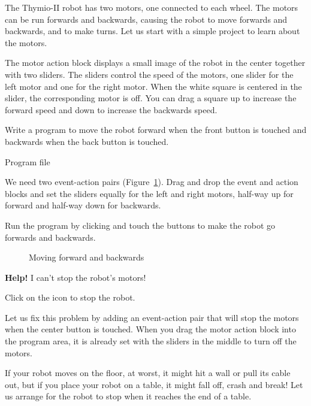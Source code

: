 

The Thymio-II robot has two motors, one connected to each wheel. The
motors can be run forwards and backwards, causing the robot to move
forwards and backwards, and to make turns. Let us start with a simple
project to learn about the motors.

The motor action block  displays a small image of the
robot in the center together with two sliders. The sliders control the
speed of the motors, one slider for the left motor and one for the right
motor. When the white square is centered in the slider, the
corresponding motor is off. You can drag a square up to increase the
forward speed and down to increase the backwards speed.

Write a program to move the robot forward when the front button
is touched and backwards when the back button is touched.

{\raggedleft \hfill Program file }

We need two event-action pairs (Figure~\ref{fig.nostop}). Drag and drop
the event and action blocks and set the sliders equally for the left and
right motors, half-way up for forward and half-way down for backwards.

Run the program by clicking  and touch the buttons to
make the robot go forwards and backwards.

\begin{figure}
\begin{center}
\caption{Moving forward and backwards}\label{fig.nostop}
\end{center}
\end{figure}


\textbf{Help!} I can't stop the robot's motors!

Click on the icon  to stop the robot.

Let us fix this problem by adding an event-action pair 
that will stop the motors when the center button is touched. When you
drag the motor action block into the program area, it is already set
with the sliders in the middle to turn off the motors.


If your robot moves on the floor, at worst, it might hit a wall or pull
its cable out, but if you place your robot on a table, it might fall
off, crash and break! Let us arrange for the robot to stop when it
reaches the end of a table.


